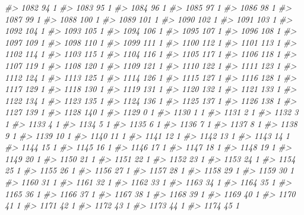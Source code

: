 \documentclass[]{article}
\newenvironment{Shaded}{\begin{snugshade}}{\end{snugshade}}
\newcommand{\CommentTok}[1]{\textcolor[rgb]{0.56,0.35,0.01}{\textit{#1}}}
\begin{document}
\begin{Shaded}
\begin{Highlighting}[]
\CommentTok{#> 1082  94  1}
\CommentTok{#> 1083  95  1}
\CommentTok{#> 1084  96  1}
\CommentTok{#> 1085  97  1}
\CommentTok{#> 1086  98  1}
\CommentTok{#> 1087  99  1}
\CommentTok{#> 1088 100  1}
\CommentTok{#> 1089 101  1}
\CommentTok{#> 1090 102  1}
\CommentTok{#> 1091 103  1}
\CommentTok{#> 1092 104  1}
\CommentTok{#> 1093 105  1}
\CommentTok{#> 1094 106  1}
\CommentTok{#> 1095 107  1}
\CommentTok{#> 1096 108  1}
\CommentTok{#> 1097 109  1}
\CommentTok{#> 1098 110  1}
\CommentTok{#> 1099 111  1}
\CommentTok{#> 1100 112  1}
\CommentTok{#> 1101 113  1}
\CommentTok{#> 1102 114  1}
\CommentTok{#> 1103 115  1}
\CommentTok{#> 1104 116  1}
\CommentTok{#> 1105 117  1}
\CommentTok{#> 1106 118  1}
\CommentTok{#> 1107 119  1}
\CommentTok{#> 1108 120  1}
\CommentTok{#> 1109 121  1}
\CommentTok{#> 1110 122  1}
\CommentTok{#> 1111 123  1}
\CommentTok{#> 1112 124  1}
\CommentTok{#> 1113 125  1}
\CommentTok{#> 1114 126  1}
\CommentTok{#> 1115 127  1}
\CommentTok{#> 1116 128  1}
\CommentTok{#> 1117 129  1}
\CommentTok{#> 1118 130  1}
\CommentTok{#> 1119 131  1}
\CommentTok{#> 1120 132  1}
\CommentTok{#> 1121 133  1}
\CommentTok{#> 1122 134  1}
\CommentTok{#> 1123 135  1}
\CommentTok{#> 1124 136  1}
\CommentTok{#> 1125 137  1}
\CommentTok{#> 1126 138  1}
\CommentTok{#> 1127 139  1}
\CommentTok{#> 1128 140  1}
\CommentTok{#> 1129   0  1}
\CommentTok{#> 1130   1  1}
\CommentTok{#> 1131   2  1}
\CommentTok{#> 1132   3  1}
\CommentTok{#> 1133   4  1}
\CommentTok{#> 1134   5  1}
\CommentTok{#> 1135   6  1}
\CommentTok{#> 1136   7  1}
\CommentTok{#> 1137   8  1}
\CommentTok{#> 1138   9  1}
\CommentTok{#> 1139  10  1}
\CommentTok{#> 1140  11  1}
\CommentTok{#> 1141  12  1}
\CommentTok{#> 1142  13  1}
\CommentTok{#> 1143  14  1}
\CommentTok{#> 1144  15  1}
\CommentTok{#> 1145  16  1}
\CommentTok{#> 1146  17  1}
\CommentTok{#> 1147  18  1}
\CommentTok{#> 1148  19  1}
\CommentTok{#> 1149  20  1}
\CommentTok{#> 1150  21  1}
\CommentTok{#> 1151  22  1}
\CommentTok{#> 1152  23  1}
\CommentTok{#> 1153  24  1}
\CommentTok{#> 1154  25  1}
\CommentTok{#> 1155  26  1}
\CommentTok{#> 1156  27  1}
\CommentTok{#> 1157  28  1}
\CommentTok{#> 1158  29  1}
\CommentTok{#> 1159  30  1}
\CommentTok{#> 1160  31  1}
\CommentTok{#> 1161  32  1}
\CommentTok{#> 1162  33  1}
\CommentTok{#> 1163  34  1}
\CommentTok{#> 1164  35  1}
\CommentTok{#> 1165  36  1}
\CommentTok{#> 1166  37  1}
\CommentTok{#> 1167  38  1}
\CommentTok{#> 1168  39  1}
\CommentTok{#> 1169  40  1}
\CommentTok{#> 1170  41  1}
\CommentTok{#> 1171  42  1}
\CommentTok{#> 1172  43  1}
\CommentTok{#> 1173  44  1}
\CommentTok{#> 1174  45  1}

\end{Highlighting}
\end{Shaded}
\end{document}
